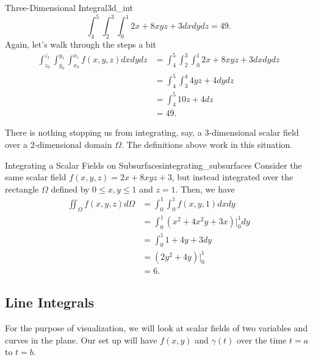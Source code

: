 \begin{ex}{Three-Dimensional Integral}{3d_int}
             	        \[
             	        \int_4^5 \int_2^3 \int_0^1 2x+8xyz+3dxdydz = 49.
             	        \]
             	        Again, let's walk through the steps a bit
             	        \begin{align*}
             	            \int_{z_0}^{z_1}\int_{y_0}^{y_1}\int_{x_0}^{x_1} f(x,y,z)dxdydz &= \int_4^5 \int_2^3 \int_0^1 2x+8xyz+3dxdydz\\
             	            &= \int_4^5 \int_3^4 4yz+4dydz\\
             	            &= \int_4^5 10z+4dz\\
             	            &= 49.
             	        \end{align*}
             	        \end{ex}
             	       
             	       \begin{remark}
             	       There is nothing stopping us from integrating, say, a 3-dimensional scalar field over a 2-dimensional domain $\Omega$. The definitions above work in this situation.  
             	       \end{remark}
             	       
             	       \begin{ex}{Integrating a Scalar Fields on Subsurfaces}{integrating_subsurfaces}
                			Consider the same scalar field $f(x,y,z) = 2x + 8xyz + 3$, but instead integrated over the rectangle $\Omega$ defined by $0\leq x,y \leq 1$ and $z=1$.  Then, we have
                			\begin{align*}
                				\iint_\Omega f(x,y,z)d\Omega &= \int_0^1 \int_0^1 f(x,y,1)dxdy\\
                				&= \int_0^1 \left(x^2 + 4x^2y+3x\right)\vert_0^1 dy\\
                				&= \int_0^1 1+4y+3 dy\\
                				&= \left(2y^2 + 4y\right)\vert_0^1\\
                				&= 6.
                			\end{align*}
                		\end{ex}
                
                \subsection{Line Integrals}
                       For the purpose of visualization, we will look at scalar fields of two variables and curves in the plane.  Our set up will have $f(x,y)$ and $\gamma(t)$ over the time $t=a$ to $t=b$.
                       
